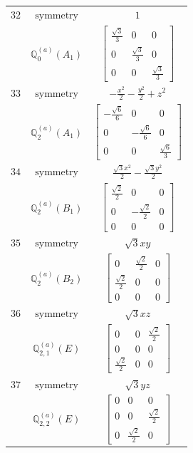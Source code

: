 \documentclass[fleqn,8pt,landscape]{jsarticle}
\begin{document}
\begin{longtable}{ccc}
$ 32 $ & $ \text{symmetry} $ & $ 1 $ \\
$  $ & $ \mathbb{Q}_{0}^{(a)}(A_{1}) $ & $ \begin{bmatrix} \frac{\sqrt{3}}{3} & 0 & 0 \\ 0 & \frac{\sqrt{3}}{3} & 0 \\ 0 & 0 & \frac{\sqrt{3}}{3} \end{bmatrix} $ \\ \hline
$ 33 $ & $ \text{symmetry} $ & $ - \frac{x^{2}}{2} - \frac{y^{2}}{2} + z^{2} $ \\
$  $ & $ \mathbb{Q}_{2}^{(a)}(A_{1}) $ & $ \begin{bmatrix} - \frac{\sqrt{6}}{6} & 0 & 0 \\ 0 & - \frac{\sqrt{6}}{6} & 0 \\ 0 & 0 & \frac{\sqrt{6}}{3} \end{bmatrix} $ \\ \hline
$ 34 $ & $ \text{symmetry} $ & $ \frac{\sqrt{3} x^{2}}{2} - \frac{\sqrt{3} y^{2}}{2} $ \\
$  $ & $ \mathbb{Q}_{2}^{(a)}(B_{1}) $ & $ \begin{bmatrix} \frac{\sqrt{2}}{2} & 0 & 0 \\ 0 & - \frac{\sqrt{2}}{2} & 0 \\ 0 & 0 & 0 \end{bmatrix} $ \\ \hline
$ 35 $ & $ \text{symmetry} $ & $ \sqrt{3} x y $ \\
$  $ & $ \mathbb{Q}_{2}^{(a)}(B_{2}) $ & $ \begin{bmatrix} 0 & \frac{\sqrt{2}}{2} & 0 \\ \frac{\sqrt{2}}{2} & 0 & 0 \\ 0 & 0 & 0 \end{bmatrix} $ \\ \hline
$ 36 $ & $ \text{symmetry} $ & $ \sqrt{3} x z $ \\
$  $ & $ \mathbb{Q}_{2,1}^{(a)}(E) $ & $ \begin{bmatrix} 0 & 0 & \frac{\sqrt{2}}{2} \\ 0 & 0 & 0 \\ \frac{\sqrt{2}}{2} & 0 & 0 \end{bmatrix} $ \\ \hline
$ 37 $ & $ \text{symmetry} $ & $ \sqrt{3} y z $ \\
$  $ & $ \mathbb{Q}_{2,2}^{(a)}(E) $ & $ \begin{bmatrix} 0 & 0 & 0 \\ 0 & 0 & \frac{\sqrt{2}}{2} \\ 0 & \frac{\sqrt{2}}{2} & 0 \end{bmatrix} $ \\ \hline

\end{longtable}
\end{document}
